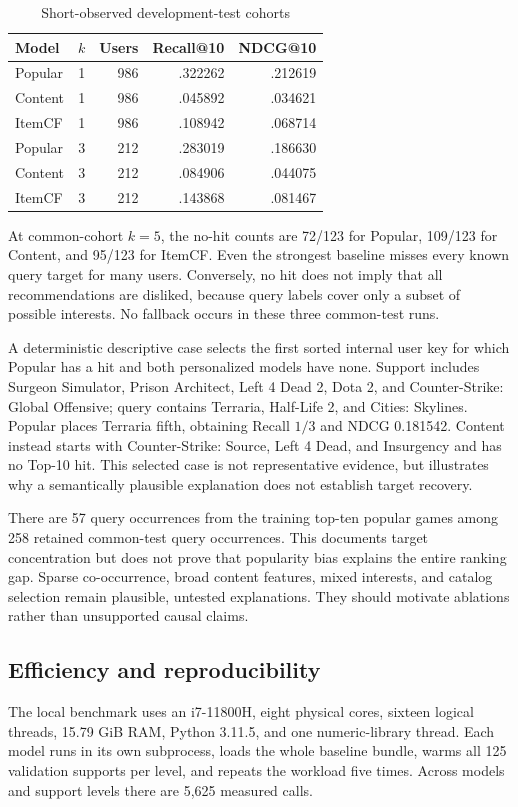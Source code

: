 \documentclass[conference,a4paper]{IEEEtran}
\begin{document}
\begin{table}[t]
\caption{Short-observed development-test cohorts}\label{tab:short}
\centering\small
\begin{tabular}{lrrrr}\toprule
Model & $k$ & Users & Recall@10 & NDCG@10\\\midrule
Popular & 1 & 986 & .322262 & .212619\\
Content & 1 & 986 & .045892 & .034621\\
ItemCF & 1 & 986 & .108942 & .068714\\
Popular & 3 & 212 & .283019 & .186630\\
Content & 3 & 212 & .084906 & .044075\\
ItemCF & 3 & 212 & .143868 & .081467\\\bottomrule
\end{tabular}
\end{table}

At common-cohort $k=5$, the no-hit counts are 72/123 for Popular, 109/123 for Content, and 95/123 for ItemCF. Even the strongest baseline misses every known query target for many users. Conversely, no hit does not imply that all recommendations are disliked, because query labels cover only a subset of possible interests. No fallback occurs in these three common-test runs.

A deterministic descriptive case selects the first sorted internal user key for which Popular has a hit and both personalized models have none. Support includes Surgeon Simulator, Prison Architect, Left 4 Dead 2, Dota 2, and Counter-Strike: Global Offensive; query contains Terraria, Half-Life 2, and Cities: Skylines. Popular places Terraria fifth, obtaining Recall $1/3$ and NDCG 0.181542. Content instead starts with Counter-Strike: Source, Left 4 Dead, and Insurgency and has no Top-10 hit. This selected case is not representative evidence, but illustrates why a semantically plausible explanation does not establish target recovery.

There are 57 query occurrences from the training top-ten popular games among 258 retained common-test query occurrences. This documents target concentration but does not prove that popularity bias explains the entire ranking gap. Sparse co-occurrence, broad content features, mixed interests, and catalog selection remain plausible, untested explanations. They should motivate ablations rather than unsupported causal claims.

\subsection{Efficiency and reproducibility}
The local benchmark uses an i7-11800H, eight physical cores, sixteen logical threads, 15.79 GiB RAM, Python 3.11.5, and one numeric-library thread. Each model runs in its own subprocess, loads the whole baseline bundle, warms all 125 validation supports per level, and repeats the workload five times. Across models and support levels there are 5,625 measured calls.
\end{document}
